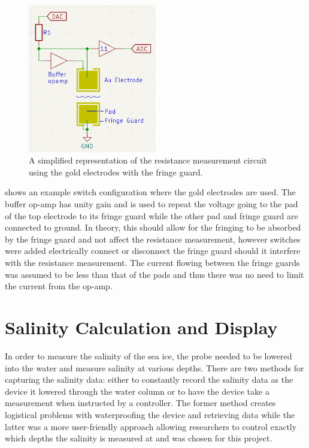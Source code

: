 \begin{figure}[!h]
    \centering
    \includegraphics[width=0.5\textwidth]{Figures/AuElectrodeExample}
    \caption{A simplified representation of the resistance measurement circuit using the gold electrodes with the fringe guard.}
    \label{fig:au-measurement-circuit} %
\end{figure}

 shows an example switch configuration where the gold electrodes are used.
The buffer op-amp has unity gain and is used to repeat the voltage going to the pad of the top electrode to its fringe guard while the other pad and fringe guard are connected to ground.
In theory, this should allow for the fringing to be absorbed by the fringe guard and not affect the resistance measurement, however switches were added electrically connect or disconnect the fringe guard should it interfere with the resistance measurement.
The current flowing between the fringe guards was assumed to be less than that of the pads and thus there was no need to limit the current from the op-amp.

\section{Salinity Calculation and Display}

In order to measure the salinity of the sea ice, the probe needed to be lowered into the water and measure salinity at various depths.
There are two methods for capturing the salinity data: either to constantly record the salinity data as the device it lowered through the water column or to have the device take a measurement when instructed by a controller.
The former method creates logistical problems with waterproofing the device and retrieving data while the latter was a more user-friendly approach allowing researchers to control exactly which depths the salinity is measured at and was chosen for this project.

